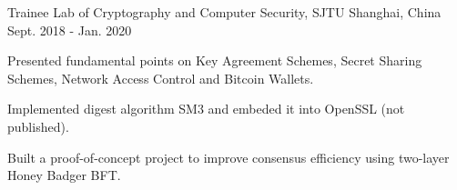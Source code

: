 \begin{cventries}
    \cventry
    {Trainee} %
    {Lab of Cryptography and Computer Security, SJTU} %
    {Shanghai, China} %
    {Sept. 2018 - Jan. 2020} %
    { %
        \begin{cvitems}
            \item Presented fundamental points on {Key Agreement Schemes}, {Secret Sharing Schemes}, {Network Access Control} and {Bitcoin Wallets}.
            \item Implemented digest algorithm {SM3} and embeded it into {OpenSSL} (not published).
            \item Built a proof-of-concept project to improve consensus efficiency using two-layer Honey Badger BFT.
        \end{cvitems}
    }


\end{cventries}


\newpage


